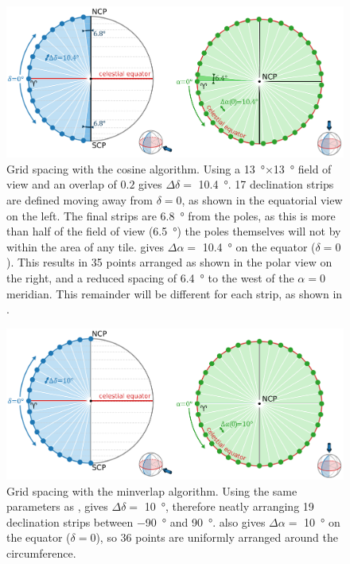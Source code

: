 \begin{colsection}
\begin{figure}[p]
    \begin{center}
        \includegraphics[width=\linewidth]{images/spacing_cosine.pdf}
    \end{center}
    \caption[Grid spacing with the cosine algorithm]{
        Grid spacing with the cosine algorithm. Using a \SI{13}{\degree}$\times$\SI{13}{\degree} field of view and an overlap of $0.2$  gives $\Delta\delta = $ \SI{10.4}{\degree}. 17 declination strips are defined moving away from $\delta=0$, as shown in the equatorial view on the left. The final strips are \SI{6.8}{\degree} from the poles, as this is more than half of the field of view (\SI{6.5}{\degree}) the poles themselves will not by within the area of any tile.  gives $\Delta\alpha = $ \SI{10.4}{\degree} on the equator ($\delta=0$). This results in 35 points arranged as shown in the polar view on the right, and a reduced spacing of \SI{6.4}{\degree} to the west of the $\alpha=0$ meridian. This remainder will be different for each strip, as shown in .
    }\label{fig:cosine_spacing}
\end{figure}

\begin{figure}[p]
    \begin{center}
        \includegraphics[width=\linewidth]{images/spacing_minverlap.pdf}
    \end{center}
    \caption[Grid spacing with the minverlap algorithm]{
        Grid spacing with the minverlap algorithm. Using the same parameters as ,  gives $\Delta\delta = $ \SI{10}{\degree}, therefore neatly arranging 19 declination strips between \SI{-90}{\degree} and \SI{90}{\degree}.  also gives $\Delta\alpha = $ \SI{10}{\degree} on the equator ($\delta=0$), so 36 points are uniformly arranged around the circumference.
    }\label{fig:minverlap_spacing}
\end{figure}


\end{colsection}
